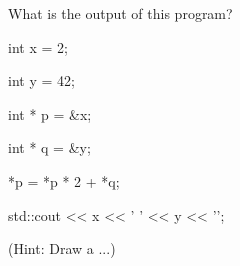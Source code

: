 What is the output of this program?

\begin{consolethree}[escapeinside=||]

int x = 2;

int y = 42;

int * p = &x;

int * q = &y;

*p = *p * 2 + *q;

std::cout << x << ' ' << y << '\n';

\end{consolethree}

(Hint: Draw a ...)

